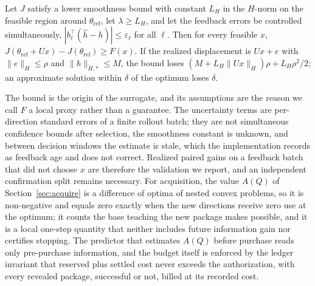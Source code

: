 \begin{proposition}\label{prop:gain}
Let $J$ satisfy a lower smoothness bound with constant $L_H$ in the
$H$-norm on the feasible region around $\theta_{\mathrm{ref}}$, let
$\lambda\ge L_H$, and let the feedback errors be controlled
simultaneously, $|b_\ell^{\top}(\hat h-h)|\le\varepsilon_\ell$ for all
$\ell$. Then for every feasible $x$,
$J(\theta_{\mathrm{ref}}+Ux)-J(\theta_{\mathrm{ref}})\ge F(x)$.
If the realized displacement is $Ux+e$ with $\|e\|_H\le\rho$ and
$\|h\|_{H,*}\le M$, the bound loses
$(M+L_H\|Ux\|_H)\rho+L_H\rho^2/2$; an approximate solution within
$\delta$ of the optimum loses $\delta$.
\end{proposition}

The bound is the origin of the surrogate, and its assumptions are the
reason we call $F$ a local proxy rather than a guarantee. The
uncertainty terms are per-direction standard errors of a finite
rollout batch; they are not simultaneous confidence bounds after
selection, the smoothness constant is unknown, and between decision
windows the estimate is stale, which the implementation records as
feedback age and does not correct. Realized paired gains on a feedback
batch that did not choose $x$ are therefore the validation we report,
and an independent confirmation split remains necessary. For
acquisition, the value $A(Q)$ of Section~\ref{sec:acquire} is a
difference of optima of nested convex problems, so it is non-negative
and equals zero exactly when the new directions receive zero use at
the optimum; it counts the base teaching the new package makes
possible, and it is a local one-step quantity that neither includes
future information gain nor certifies stopping. The predictor that
estimates $A(Q)$ before purchase reads only pre-purchase information,
and the budget itself is enforced by the ledger invariant that
reserved plus settled cost never exceeds the authorization, with every
revealed package, successful or not, billed at its recorded cost.
